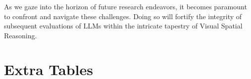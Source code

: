 \documentclass[twocolumn,11pt]{report}
\begin{document}
As we gaze into the horizon of future research endeavors, it becomes paramount to confront and navigate these challenges. Doing so will fortify the integrity of subsequent evaluations of LLMs within the intricate tapestry of Visual Spatial Reasoning.









\appendix

\onecolumn
\chapter{Extra Tables}\label{app:Extra_Tables}
%
\end{document}
